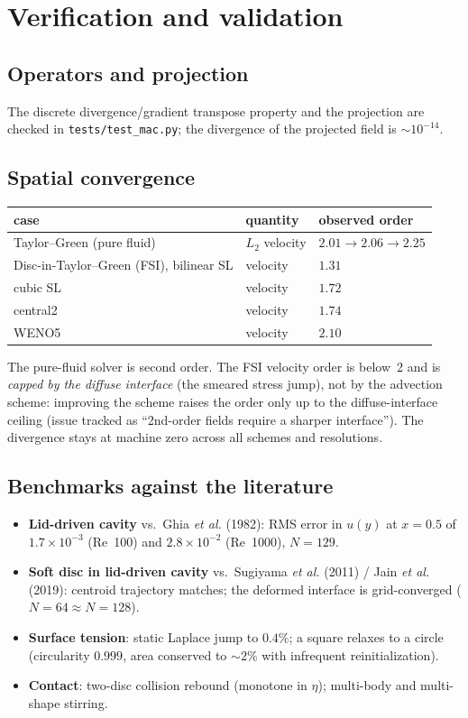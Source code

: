 \documentclass[11pt]{article}
\begin{document}
\section{Verification and validation}
\label{sec:vv}
\subsection{Operators and projection}
The discrete divergence/gradient transpose property and the projection are checked
in \texttt{tests/test\_mac.py}; the divergence of the projected field is
$\sim\!10^{-14}$.

\subsection{Spatial convergence}
\label{sec:conv}
\begin{center}
\begin{tabular}{lll}
\toprule
case & quantity & observed order \\
\midrule
Taylor--Green (pure fluid) & $L_2$ velocity & $2.01\!\to\!2.06\!\to\!2.25$ \\
Disc-in-Taylor--Green (FSI), bilinear SL & velocity & $1.31$ \\
\quad cubic SL & velocity & $1.72$ \\
\quad central2 & velocity & $1.74$ \\
\quad WENO5 & velocity & $2.10$ \\
\bottomrule
\end{tabular}
\end{center}
The pure-fluid solver is second order. The FSI velocity order is below~2 and is
\emph{capped by the diffuse interface} (the smeared stress jump), not by the
advection scheme: improving the scheme raises the order only up to the
diffuse-interface ceiling (issue tracked as ``2nd-order fields require a sharper
interface''). The divergence stays at machine zero across all schemes and
resolutions.

\subsection{Benchmarks against the literature}
\begin{itemize}[nosep]
  \item \textbf{Lid-driven cavity} vs.\ Ghia \emph{et al.} (1982): RMS error in
  $u(y)$ at $x{=}0.5$ of $1.7\times10^{-3}$ (Re~100) and $2.8\times10^{-2}$
  (Re~1000), $N{=}129$.
  \item \textbf{Soft disc in lid-driven cavity} vs.\ Sugiyama \emph{et al.} (2011)
  / Jain \emph{et al.} (2019): centroid trajectory matches; the deformed interface
  is grid-converged ($N{=}64\approx N{=}128$).
  \item \textbf{Surface tension}: static Laplace jump to $0.4\%$; a square relaxes
  to a circle (circularity $0.999$, area conserved to $\sim2\%$ with infrequent
  reinitialization).
  \item \textbf{Contact}: two-disc collision rebound (monotone in $\eta$);
  multi-body and multi-shape stirring.
\end{itemize}
\end{document}
